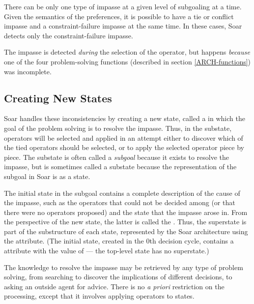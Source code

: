 There can be only one type of impasse at a given level of subgoaling at a time. Given the semantics of the preferences, it is possible to have a tie or conflict impasse and a constraint-failure impasse at the same time.  In these cases, Soar detects only the constraint-failure impasse.

The impasse is detected \textit{during} the selection of the operator, but happens \textit{because} one of the four problem-solving functions (described in section \ref{ARCH-functions}) was incomplete.

\subsection{Creating New States}

Soar handles these inconsistencies by creating a new state, called a  in which the
goal of the problem solving is to resolve the impasse.  Thus, in the
substate, operators will be selected and applied in an attempt either to
discover which of the tied operators should be selected, or to apply the
selected operator piece by piece.  The substate is often called a
\emph{subgoal} because it exists to resolve the impasse, but is
sometimes called a substate because the representation of the subgoal in
Soar is as a state.

The initial state in the subgoal contains a complete description of the
cause of the impasse, such as the operators that could not be decided
among (or that there were no operators proposed) and the state that the
impasse arose in. From the perspective of the new state, the latter is
called the . Thus, the superstate is part of the
substructure of each state, represented by the Soar architecture using
the  attribute. (The initial state, created in the 0th
decision cycle, contains a  attribute with the value of
 --- the top-level state has no superstate.)

The knowledge to resolve the impasse may be retrieved by any type of
problem solving, from searching to discover the implications of different
decisions, to asking an outside agent for advice. There is no \emph{a priori}
restriction on the processing, except that it involves applying operators to
states.

\begin{figure}
\label{fig:stack1}
\end{figure}

